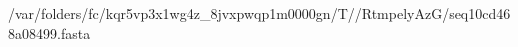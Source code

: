 \documentclass[10pt]{article}
\begin{document}
\begin{texshade}{/var/folders/fc/kqr5vp3x1wg4z_8jvxpwqp1m0000gn/T//RtmpelyAzG/seq10cd468a08499.fasta}
\hidelogoscale
{}
\showlegend
\end{texshade}
\end{document}

